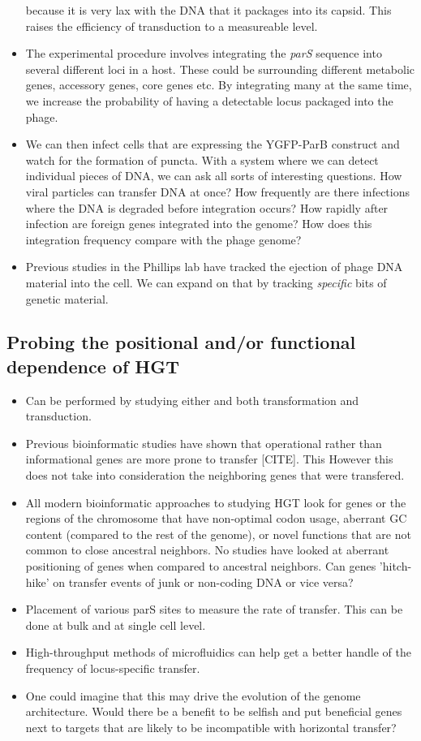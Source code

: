 \begin{itemize}
		because it is very lax with the DNA that it packages
		into its capsid. This raises the efficiency of
		transduction to a measureable level. 
	\item The experimental procedure involves integrating the
		\textit{parS} sequence into several different loci in a
		host. These could be surrounding different metabolic
		genes, accessory genes,  core genes etc. By integrating
		many at the same time, we increase the probability of
		having a detectable locus packaged into the phage.
	\item We can then infect cells that are expressing the YGFP-ParB
		construct and watch for the formation of puncta. With a
		system where we can detect individual pieces of DNA, we
		can ask all sorts of interesting questions. How viral
		particles can transfer DNA at once? How frequently are
		there infections where the DNA is degraded before
		integration occurs? How rapidly after infection are
		foreign genes integrated into the genome? How does this
		integration frequency compare with the phage genome?
	\item Previous studies in the Phillips lab have tracked the
		ejection of phage DNA material into the cell. We can
		expand on that by tracking \textit{specific} bits of
		genetic material.

\end{itemize}
\subsection*{Probing the positional and/or functional dependence of HGT}
\begin{itemize}
	\item Can be performed by studying either and both transformation and transduction.
	\item Previous bioinformatic studies have shown that operational rather
		than informational genes are more prone to transfer [CITE]. This
		However this does not take into consideration the neighboring
		genes that were transfered.
	\item All modern bioinformatic approaches to studying HGT look for genes
		or the regions of the chromosome that have non-optimal codon
		usage, aberrant GC content (compared to the rest of the genome),
		or novel functions that are not common to close ancestral
		neighbors. No studies have looked at aberrant positioning of
		genes when compared to ancestral neighbors. Can genes
		'hitch-hike' on transfer events of junk or non-coding DNA or
		vice versa? 
	\item Placement of various parS sites to measure the rate of transfer.
		This can be done at bulk and at single cell level.
	\item High-throughput methods of microfluidics can help get a better
		handle of the frequency of locus-specific transfer.
	\item One could imagine that this may drive the evolution of the genome
		architecture. Would there be a benefit to be selfish and put
		beneficial genes next to targets that are likely to be
		incompatible with horizontal transfer?
\end{itemize}

